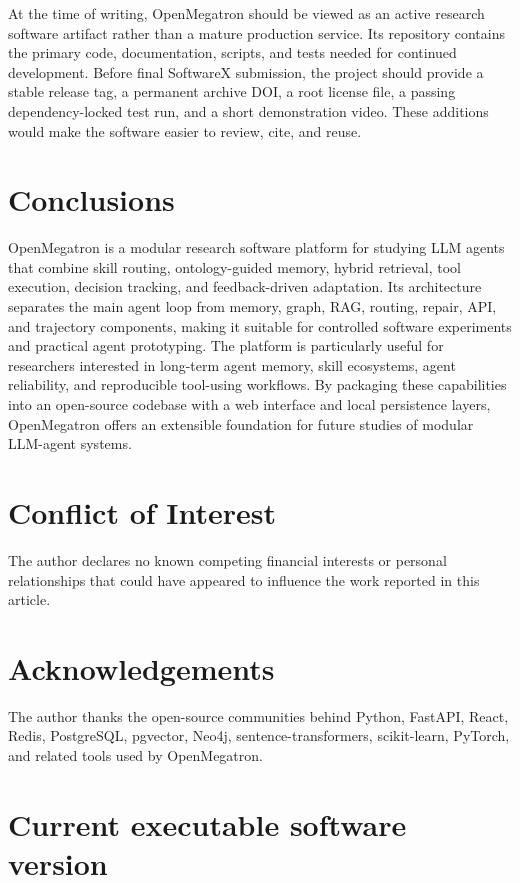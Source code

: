 \documentclass[preprint,12pt,a4paper]{elsarticle}
\begin{document}
At the time of writing, OpenMegatron should be viewed as an active research software artifact rather than a mature production service. Its repository contains the primary code, documentation, scripts, and tests needed for continued development. Before final SoftwareX submission, the project should provide a stable release tag, a permanent archive DOI, a root license file, a passing dependency-locked test run, and a short demonstration video. These additions would make the software easier to review, cite, and reuse.

\section{Conclusions}

OpenMegatron is a modular research software platform for studying LLM agents that combine skill routing, ontology-guided memory, hybrid retrieval, tool execution, decision tracking, and feedback-driven adaptation. Its architecture separates the main agent loop from memory, graph, RAG, routing, repair, API, and trajectory components, making it suitable for controlled software experiments and practical agent prototyping. The platform is particularly useful for researchers interested in long-term agent memory, skill ecosystems, agent reliability, and reproducible tool-using workflows. By packaging these capabilities into an open-source codebase with a web interface and local persistence layers, OpenMegatron offers an extensible foundation for future studies of modular LLM-agent systems.

\section*{Conflict of Interest}

The author declares no known competing financial interests or personal relationships that could have appeared to influence the work reported in this article.

\section*{Acknowledgements}

The author thanks the open-source communities behind Python, FastAPI, React, Redis, PostgreSQL, pgvector, Neo4j, sentence-transformers, scikit-learn, PyTorch, and related tools used by OpenMegatron.

\section*{Current executable software version}
\end{document}

